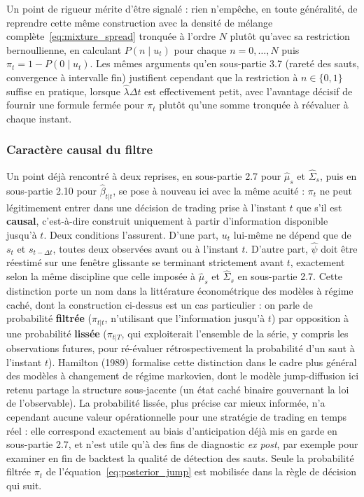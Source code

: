 \documentclass{article}
\begin{document}
Un point de rigueur mérite d'être signalé : rien n'empêche, en toute généralité, de reprendre cette même construction avec la densité de mélange complète~\eqref{eq:mixture_spread} tronquée à l'ordre $N$ plutôt qu'avec sa restriction bernoullienne, en calculant $P(n \mid u_t)$ pour chaque $n=0,\dots,N$ puis $\pi_t = 1-P(0\mid u_t)$. Les mêmes arguments qu'en sous-partie 3.7 (rareté des sauts, convergence à intervalle fin) justifient cependant que la restriction à $n\in\{0,1\}$ suffise en pratique, lorsque $\hat\lambda\Delta t$ est effectivement petit, avec l'avantage décisif de fournir une formule fermée pour $\pi_t$ plutôt qu'une somme tronquée à réévaluer à chaque instant.
\subsubsection*{Caractère causal du filtre}
Un point déjà rencontré à deux reprises, en sous-partie 2.7 pour $\hat\mu_s$ et $\hat{\Sigma}_s$, puis en sous-partie 2.10 pour $\hat\beta_{t|t}$, se pose à nouveau ici avec la même acuité : $\pi_t$ ne peut légitimement entrer dans une décision de trading prise à l'instant $t$ que s'il est \textbf{causal}, c'est-à-dire construit uniquement à partir d'information disponible jusqu'à $t$. Deux conditions l'assurent. D'une part, $u_t$ lui-même ne dépend que de $s_t$ et $s_{t-\Delta t}$, toutes deux observées avant ou à l'instant $t$. D'autre part, $\hat{\psi}$ doit être réestimé sur une fenêtre glissante se terminant strictement avant $t$, exactement selon la même discipline que celle imposée à $\hat\mu_s$ et $\hat{\Sigma}_s$ en sous-partie 2.7.
Cette distinction porte un nom dans la littérature économétrique des modèles à régime caché, dont la construction ci-dessus est un cas particulier : on parle de probabilité \textbf{filtrée} ($\pi_{t|t}$, n'utilisant que l'information jusqu'à $t$) par opposition à une probabilité \textbf{lissée} ($\pi_{t|T}$, qui exploiterait l'ensemble de la série, y compris les observations futures, pour ré-évaluer rétrospectivement la probabilité d'un saut à l'instant $t$). Hamilton (1989) formalise cette distinction dans le cadre plus général des modèles à changement de régime markovien, dont le modèle jump-diffusion ici retenu partage la structure sous-jacente (un état caché binaire gouvernant la loi de l'observable). La probabilité lissée, plus précise car mieux informée, n'a cependant aucune valeur opérationnelle pour une stratégie de trading en temps réel : elle correspond exactement au biais d'anticipation déjà mis en garde en sous-partie 2.7, et n'est utile qu'à des fins de diagnostic \emph{ex post}, par exemple pour examiner en fin de backtest la qualité de détection des sauts. Seule la probabilité filtrée $\pi_t$ de l'équation~\eqref{eq:posterior_jump} est mobilisée dans la règle de décision qui suit.
\end{document}

